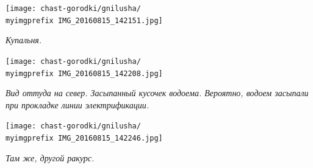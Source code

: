 



\begin{center}
\texttt{[image: chast-gorodki/gnilusha/\\myimgprefix IMG\_20160815\_142151.jpg]}

\textit{Купальня.}
\end{center}

\newpage




\begin{center}
\texttt{[image: chast-gorodki/gnilusha/\\myimgprefix IMG\_20160815\_142208.jpg]}

\textit{Вид оттуда на север. Засыпанный кусочек водоема. Вероятно, водоем засыпали при прокладке линии электрификации.}
\end{center}

\begin{center}
\texttt{[image: chast-gorodki/gnilusha/\\myimgprefix IMG\_20160815\_142246.jpg]}

\textit{Там же, другой ракурс.}
\end{center}

\newpage







%
%


